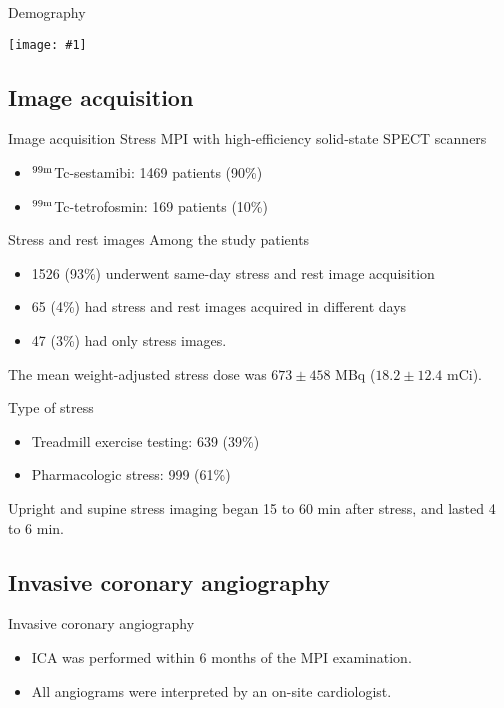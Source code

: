 \documentclass{beamer}
\newcommand*{\solo}[1]{\texttt{[image: \#1]}}
\begin{document}
\begin{frame}{Demography}
    \begin{center}
        \solo{0.eps}
    \end{center}
\end{frame}

\subsection{Image acquisition}
\begin{frame}{Image acquisition}
    Stress MPI with high-efficiency solid-state SPECT scanners
    \begin{itemize}
        \item $^{99\textup{m}}$Tc-sestamibi: 1469 patients (90\%)
        \item $^{99\textup{m}}$Tc-tetrofosmin: 169 patients (10\%)
    \end{itemize}
\end{frame}

\begin{frame}{Stress and rest images}
    Among the study patients
    \begin{itemize}
        \item 1526 (93\%) underwent same-day stress and rest image acquisition
        \item 65 (4\%) had stress and rest images acquired in different days
        \item 47 (3\%) had only stress images.
    \end{itemize}

    The mean weight-adjusted stress dose was $673 \pm 458$ MBq ($18.2 \pm 12.4$ mCi).
\end{frame}

\begin{frame}{Type of stress}
    \begin{itemize}
        \item Treadmill exercise testing: 639 (39\%)
        \item Pharmacologic stress: 999 (61\%)
    \end{itemize}

    Upright and supine stress imaging began 15 to 60 min after stress, and
    lasted 4 to 6 min.
\end{frame}

\subsection{Invasive coronary angiography}
\begin{frame}{Invasive coronary angiography}
    \begin{itemize}
        \item ICA was performed within 6 months of the MPI examination.
        \item All angiograms were interpreted by an on-site cardiologist.
    \end{itemize}
\end{frame}
\end{document}
